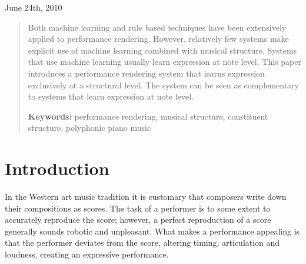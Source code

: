 \documentclass[a4paper,10pt]{article}
\begin{document}
\begin{titlepage}
\begin{center}
\vspace{1.5cm}

June 24th, 2010

\end{center}

\end{titlepage}



\begin{abstract}
Both machine learning and rule based techniques have been extensively applied to performance rendering. However, relatively few systems make explicit use of machine learning combined with musical structure. Systems that use machine learning usually learn expression at note level. This paper introduces a performance rendering system that learns expression exclusively at a structural level. The system can be seen as complementary to systems that learn expression at note level. 




{\bf Keywords:} performance rendering, musical structure, constituent structure, polyphonic piano music
\end{abstract}
\section{Introduction}

In the Western art music tradition it is customary that composers write down their compositions as scores. The task of a performer is to some extent to accurately reproduce the score; however, a perfect reproduction of a score generally sounds robotic and unpleasant. What makes a performance appealing is that the performer deviates from the score, altering timing, articulation and loudness, creating an expressive performance.
\end{document}
